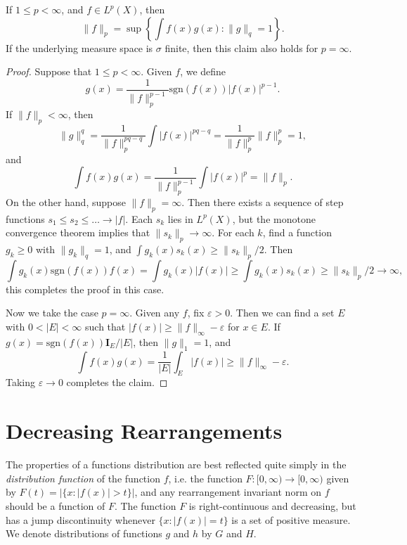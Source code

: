\begin{theorem}
    If $1 \leq p < \infty$, and $f \in L^p(X)$, then
    \[ \| f \|_p = \sup \left\{ \int f(x)g(x) : \| g \|_q = 1 \right\}. \]
    If the underlying measure space is $\sigma$ finite, then this claim also holds for $p = \infty$.
\end{theorem}
\begin{proof}
    Suppose that $1 \leq p < \infty$. Given $f$, we define
    \[ g(x) = \frac{1}{\| f \|_p^{p-1}} \text{sgn}(f(x)) |f(x)|^{p-1}. \]
    If $\| f \|_p < \infty$, then
    \[ \| g \|_q^q = \frac{1}{\| f \|_p^{pq - q}} \int |f(x)|^{pq-q} = \frac{1}{\| f \|_p^p} \| f \|_p^p = 1, \]
    and
    \[ \int f(x) g(x) = \frac{1}{\| f \|_p^{p-1}} \int |f(x)|^p = \| f \|_p. \]
    On the other hand, suppose $\| f \|_p = \infty$. Then there exists a sequence of step functions $s_1 \leq s_2 \leq \dots \to |f|$. Each $s_k$ lies in $L^p(X)$, but the monotone convergence theorem implies that $\| s_k \|_p \to \infty$. For each $k$, find a function $g_k \geq 0$ with $\| g_k \|_q = 1$, and $\int g_k(x) s_k(x) \geq \| s_k \|_p / 2$. Then
    \[ \int g_k(x) \text{sgn}(f(x)) f(x) = \int g_k(x) |f(x)| \geq \int g_k(x) s_k(x) \geq \| s_k \|_p / 2 \to \infty, \]
    this completes the proof in this case.

    Now we take the case $p = \infty$. Given any $f$, fix $\varepsilon > 0$. Then we can find a set $E$ with $0 < |E| < \infty$ such that $|f(x)| \geq \| f \|_\infty - \varepsilon$ for $x \in E$. If $g(x) = \text{sgn}(f(x)) \mathbf{I}_E / |E|$, then $\| g \|_1 = 1$, and
    \[ \int f(x) g(x) = \frac{1}{|E|} \int_E |f(x)| \geq \| f \|_\infty - \varepsilon. \]
    Taking $\varepsilon \to 0$ completes the claim.
\end{proof}

\section{Decreasing Rearrangements}

 The properties of a functions distribution are best reflected quite simply in the \emph{distribution function} of the function $f$, i.e. the function $F: [0,\infty) \to [0,\infty)$ given by $F(t) = |\{ x : |f(x)| > t \}|$, and any rearrangement invariant norm on $f$ should be a function of $F$. The function $F$ is right-continuous and decreasing, but has a jump discontinuity whenever $\{ x : |f(x)| = t \}$ is a set of positive measure. We denote distributions of functions $g$ and $h$ by $G$ and $H$.

